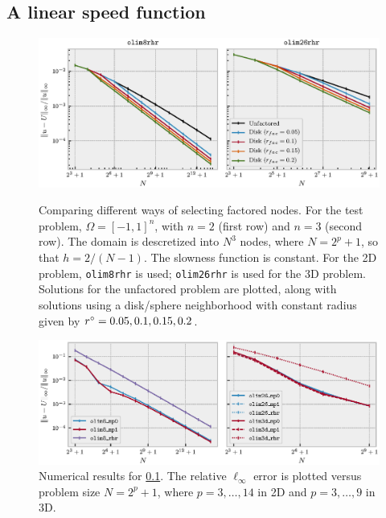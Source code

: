 \documentclass[sisc-eikonal.tex]{subfiles}
\begin{document}
\subsection{A linear speed function}\label{ssec:slotnick}

\begin{figure}
  \centering
  \includegraphics{factoring-error-example.eps}%
  \vspace{-1.4em}
  \caption{Comparing different ways of selecting factored nodes. For
    the test problem, $\Omega = [-1, 1]^n$, with $n = 2$ (first row)
    and $n = 3$ (second row). The domain is descretized into $N^3$
    nodes, where $N = 2^p + 1$, so that $h = 2/(N - 1)$. The slowness
    function is constant. For the 2D problem, \texttt{olim8rhr} is
    used; \texttt{olim26rhr} is used for the 3D problem. Solutions for
    the unfactored problem are plotted, along with solutions using a
    disk/sphere neighborhood with constant radius given by
    $r^\circ = 0.05, 0.1, 0.15,
    0.2$.}\label{fig:factoring-error-example}
  \includegraphics{qv_plots.eps}
  \caption{Numerical results for \cref{ssec:slotnick}. The relative
    $\ell_\infty$ error is plotted versus problem size $N = 2^p + 1$,
    where $p = 3, \hdots, 14$ in 2D and $p = 3, \hdots, 9$ in
    3D.}\label{fig:qv}
\end{figure}
\end{document}
